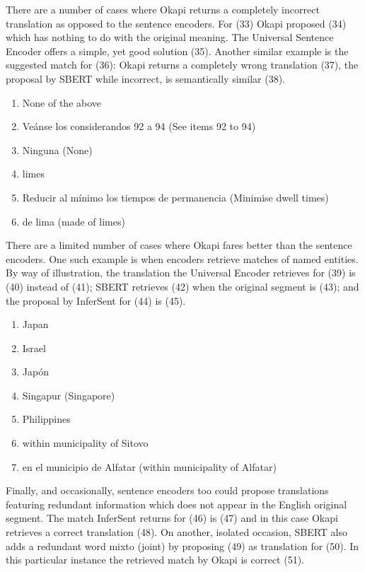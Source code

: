 There are a number of cases where Okapi returns a completely incorrect translation as opposed to the sentence encoders. For (33) Okapi proposed (34) which has nothing to do with the original meaning. The Universal Sentence Encoder offers a simple, yet good solution (35). Another similar example is the suggested match for (36): Okapi returns a completely wrong translation (37), the proposal by SBERT while incorrect, is semantically similar (38). 

\begin{enumerate}[resume,label={(\arabic*)}]
	\item	None of the above
	\item	Veánse los considerandos 92 a 94 (See items 92 to 94)
	\item	Ninguna (None)
	\item	limes
	\item	Reducir al mínimo los tiempos de permanencia (Minimise dwell times)
	\item	de lima (made of limes)
	
\end{enumerate}

There are a limited number of cases where Okapi fares better than the sentence encoders. One such example is when encoders retrieve matches of named entities. By way of illustration, the translation the Universal Encoder retrieves for (39) is (40) instead of (41); SBERT retrieves (42) when the original segment is (43); and the proposal by InferSent for (44) is (45). 

\begin{enumerate}[resume,label={(\arabic*)}]
	\item	Japan
	\item	Israel
	\item	Japón
	\item	Singapur (Singapore)
	\item	Philippines
	\item	within municipality of Sitovo
	\item	en el municipio de Alfatar (within municipality of Alfatar)
\end{enumerate}

Finally, and occasionally, sentence encoders too could propose translations featuring redundant information which does not appear in the English original segment. The match InferSent returns for (46) is (47) and in this case Okapi retrieves a correct translation (48). On another, isolated occasion, SBERT also adds a redundant word mixto (joint) by proposing (49) as translation for (50). In this particular instance the retrieved match by Okapi is correct (51). 

